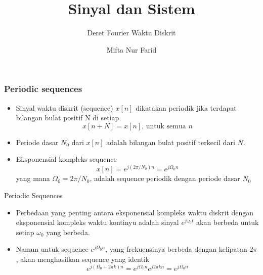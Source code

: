 \documentclass[pdflatex,compress,mathserif]{beamer}
\title{Sinyal dan Sistem}
\subtitle{Deret Fourier Waktu Diskrit}
\author{Mifta Nur Farid}
\begin{document}
\maketitle

\begin{frame}
	\frametitle{Periodic sequences}
	\begin{itemize}
		\item Sinyal waktu diskrit (sequence) $ x[n] $ dikatakan periodik jika terdapat bilangan bulat positif N di setiap
		\begin{equation}\label{eq.1}
			x[n + N] = x[n]\text{, untuk semua }n
		\end{equation}
		\item Periode dasar $ N_0 $ dari $ x[n] $ adalah bilangan bulat positif terkecil dari $ N $.
		\item Eksponensial kompleks sequence
		\begin{equation}\label{eq.2}
			x[n] = e^{j(2\pi/N_0)n} = e^{j\Omega_0 n}
		\end{equation}
		yang mana $ \Omega_0 = 2\pi / N_0 $, adalah sequence periodik dengan periode dasar $ N_0 $
	\end{itemize}
\end{frame}

\begin{frame}{Periodic Sequences}
	\begin{itemize}
		\item Perbedaan yang penting antara eksponensial kompleks waktu diskrit dengan eksponensial kompleks waktu kontinyu adalah sinyal $ e^{j\omega_0 t} $ akan berbeda untuk setiap $ \omega_0 $ yang berbeda.
		\item Namun untuk sequence $ e^{j \Omega_0 n} $, yang frekuensinya berbeda dengan kelipatan $ 2 \pi $, akan menghasilkan sequence yang identik
		\begin{equation}\label{eq.3}
			e^{j(\Omega_0 + 2 \pi k)n} = e^{j\Omega_0n} e^{j2 \pi kn} = e^{j\Omega_0n}
		\end{equation}
	\end{itemize}
\end{frame}
\end{document}
